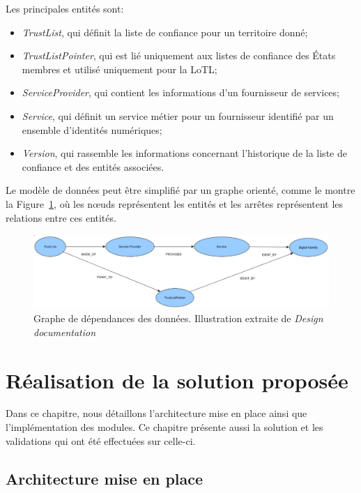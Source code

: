 \documentclass{tnreport}
\begin{document}
Les principales entités sont:
\begin{itemize}
	\item \textit{TrustList}, qui définit la liste de confiance pour un territoire donné;
	\item \textit{TrustListPointer}, qui est lié uniquement aux listes de confiance des États membres et utilisé uniquement pour la LoTL;
	\item \textit{ServiceProvider}, qui contient les informations d'un fournisseur de services;
	\item \textit{Service}, qui définit un service métier pour un fournisseur identifié par un ensemble d'identités numériques;
	\item \textit{Version}, qui rassemble les informations concernant l'historique de la liste de confiance et des entités associées.
\end{itemize}
\clearpage

Le modèle de données peut être simplifié par un graphe orienté, comme le montre la Figure~\ref{fig:dependencies}, où les nœuds représentent les entités et les arrêtes représentent les relations entre ces entités.

\begin{figure}[h]
	\centering
	\includegraphics[scale=0.42]{figures/dependencies}
	\caption{Graphe de dépendances des données. Illustration extraite de \textit{Design documentation}~\cite{design-document}}
	\label{fig:dependencies}
\end{figure}

\chapter{Réalisation de la solution proposée}
\label{chap:realisation}

Dans ce chapitre, nous détaillons l'architecture mise en place ainsi que l'implémentation des modules. Ce chapitre présente aussi la solution et les validations qui ont été effectuées sur celle-ci.

\section{Architecture mise en place}
\label{sec:architecture}
\end{document}
